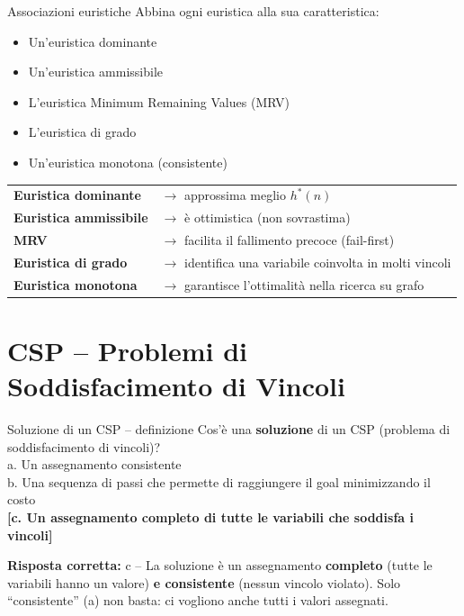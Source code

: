 \documentclass[12pt,a4paper]{article}
\newcommand{\corr}[1]{\textcolor{green!55!black}{\textbf{[#1]}}}
\newcommand{\risp}[1]{\begin{abox}\textbf{Risposta corretta: }#1\end{abox}}
\begin{document}
\bigskip
\begin{qbox}{Associazioni euristiche}
Abbina ogni euristica alla sua caratteristica:
\begin{itemize}[noitemsep]
  \item Un'euristica dominante
  \item Un'euristica ammissibile
  \item L'euristica Minimum Remaining Values (MRV)
  \item L'euristica di grado
  \item Un'euristica monotona (consistente)
\end{itemize}
\end{qbox}
\begin{abox}
\begin{tabular}{ll}
\textbf{Euristica dominante} & $\to$ approssima meglio $h^*(n)$ \\
\textbf{Euristica ammissibile} & $\to$ è ottimistica (non sovrastima) \\
\textbf{MRV} & $\to$ facilita il fallimento precoce (fail-first) \\
\textbf{Euristica di grado} & $\to$ identifica una variabile coinvolta in molti vincoli \\
\textbf{Euristica monotona} & $\to$ garantisce l'ottimalità nella ricerca su grafo \\
\end{tabular}
\end{abox}

\section{CSP -- Problemi di Soddisfacimento di Vincoli}

\begin{qbox}{Soluzione di un CSP -- definizione}
Cos'è una \textbf{soluzione} di un CSP (problema di soddisfacimento di vincoli)?\\[4pt]
a. Un assegnamento consistente\\
b. Una sequenza di passi che permette di raggiungere il goal minimizzando il costo\\
\corr{c. Un assegnamento completo di tutte le variabili che soddisfa i vincoli}
\end{qbox}
\risp{c -- La soluzione è un assegnamento \textbf{completo} (tutte le variabili hanno un valore) \textbf{e consistente} (nessun vincolo violato). Solo ``consistente'' (a) non basta: ci vogliono anche tutti i valori assegnati.}
\end{document}
